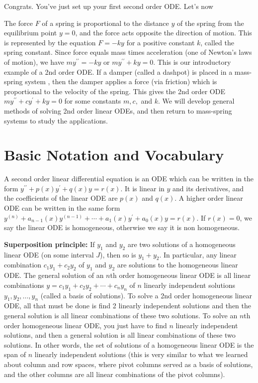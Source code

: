 Congrats.  You've just set up your first second order ODE. Let's now 



The force $F$ of a spring is proportional to the distance $y$ of the spring from the equilibrium point $y=0$, and the force acts opposite the direction of motion. This is represented by the equation $F=-ky$ for a positive constant $k$, called the spring constant.  Since force equals mass times acceleration (one of Newton's laws of motion), we have $my^{\prime\prime}=-ky$ or $my^{\prime\prime}+ky=0$. This is our introductory example of a 2nd order ODE.  If a damper (called a dashpot) is placed in a mass-spring system , then the damper applies a force (via friction) which is proportional to the velocity of the spring.  This gives the 2nd order ODE $my^{\prime\prime}+cy^\prime+ky=0$ for some constants $m,c,$ and $k$.  We will develop general methods of solving 2nd order linear ODEs, and then return to mass-spring systems to study the applications.

\section{Basic Notation and Vocabulary}
A second order linear differential equation is an ODE which can be written in the form $y^{\prime\prime}+p(x)y^\prime+q(x)y=r(x)$. It is linear in $y$ and its derivatives, and the coefficients of the linear ODE are $p(x)$ and $q(x)$.  A higher order linear ODE can be written in the same form $y^{(n)}+a_{n-1}(x)y^{(n-1)} + \cdots + a_1(x)y^\prime+a_0(x)y=r(x)$. If $r(x)=0$, we say the linear ODE is homogeneous, otherwise we say it is non homogeneous.

{\bf Superposition principle:} If $y_1$ and $y_2$ are two solutions of a homogeneous linear ODE (on some interval $J$), then so is $y_1+y_2$. In particular, any linear combination $c_1y_1+c_2y_2$ of $y_1$ and $y_2$ are solutions to the homogeneous linear ODE. The general solution of an $n$th order homogeneous linear ODE is all linear combinations $y=c_1y_1+c_2y_2+\cdots+c_n y_n$ of $n$ linearly independent solutions $y_1, y_2,\ldots,y_n$ (called a basis of solutions). To solve a 2nd order homogeneous linear ODE, all that must be done is find 2 linearly independent solutions and then the general solution is all linear combinations of these two solutions. To solve an $n$th order homogeneous linear ODE, you just have to find $n$ linearly independent solutions, and then a general solution is all linear combinations of these two solutions.  In other words, the set of solutions of a homogeneous linear ODE is the span of $n$ linearly independent solutions (this is very similar to what we learned about column and row spaces, where pivot columns served as a basis of solutions, and the other columns are all linear combinations of the pivot columns). 



